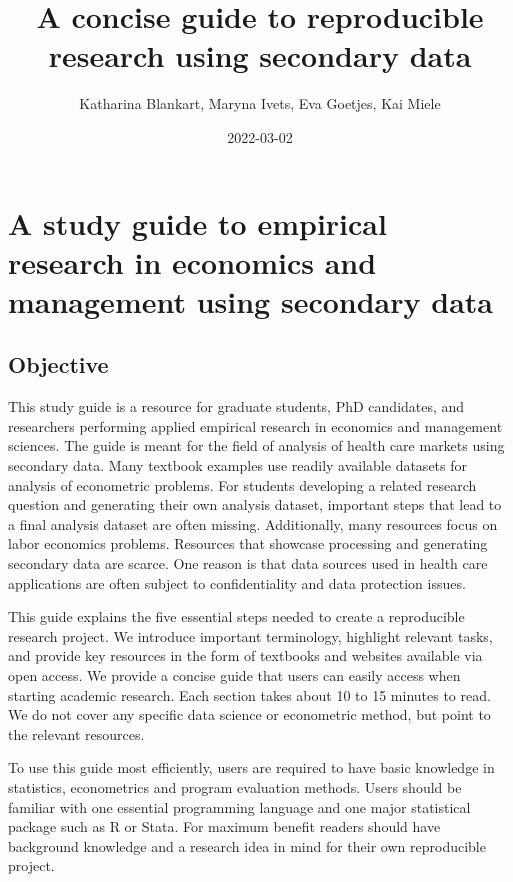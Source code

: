 \documentclass[
]{book}
\title{A concise guide to reproducible research using secondary data}
\author{Katharina Blankart, Maryna Ivets, Eva Goetjes, Kai Miele}
\date{2022-03-02}
\begin{document}
\frontmatter
\maketitle

\mainmatter
\hypertarget{a-study-guide-to-empirical-research-in-economics-and-management-using-secondary-data}{%
\chapter*{A study guide to empirical research in economics and
management using secondary
data}\label{a-study-guide-to-empirical-research-in-economics-and-management-using-secondary-data}}

\hypertarget{objective}{%
\section*{Objective}\label{objective}}

This study guide is a resource for graduate students, PhD candidates,
and researchers performing applied empirical research in economics and
management sciences. The guide is meant for the field of analysis of
health care markets using secondary data. Many textbook examples use
readily available datasets for analysis of econometric problems. For
students developing a related research question and generating their own
analysis dataset, important steps that lead to a final analysis dataset
are often missing. Additionally, many resources focus on labor economics
problems. Resources that showcase processing and generating secondary
data are scarce. One reason is that data sources used in health care
applications are often subject to confidentiality and data protection
issues.

This guide explains the five essential steps needed to create a
reproducible research project. We introduce important terminology,
highlight relevant tasks, and provide key resources in the form of
textbooks and websites available via open access. We provide a concise
guide that users can easily access when starting academic research. Each
section takes about 10 to 15 minutes to read. We do not cover any
specific data science or econometric method, but point to the relevant
resources.

To use this guide most efficiently, users are required to have basic
knowledge in statistics, econometrics and program evaluation methods.
Users should be familiar with one essential programming language and one
major statistical package such as R or Stata. For maximum benefit
readers should have background knowledge and a research idea in mind for
their own reproducible project.
\end{document}
